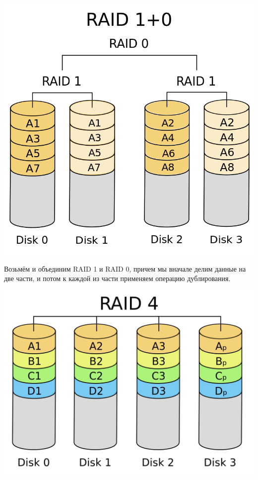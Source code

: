 \documentclass[12pt, a4paper]{article}
\begin{document}
\begin{center}
\includegraphics[scale=0.2]{./images/RAID10.png}
\end{center}

Возьмём и объединим RAID 1 и RAID 0, причем мы вначале делим данные на две части, и потом к каждой из части применяем операцию дублирования. 

\begin{center}
\includegraphics[scale=0.13]{./images/RAID4.png}
\end{center}
\end{document}
